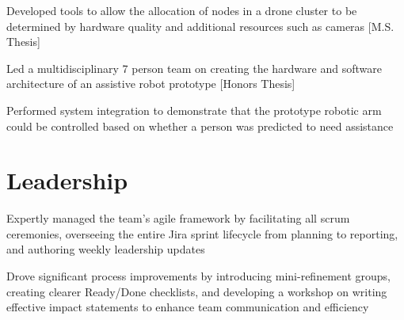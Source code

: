 \documentclass[]{deedy-resume-reversed}
\begin{document}
\begin{minipage}[t]{0.68\textwidth}
\descript{}
\begin{tightemize}
\item Developed tools to allow the allocation of nodes in a drone cluster to be determined by hardware quality and additional resources such as cameras [M.S. Thesis]
\item Led a multidisciplinary 7 person team on creating the hardware and software architecture of an assistive robot prototype [Honors Thesis]
\item Performed system integration to demonstrate that the prototype robotic arm could be controlled based on whether a person was predicted to need assistance 
\end{tightemize}
\sectionsep


\section{Leadership}

\begin{tightemize}
\item Expertly managed the team's agile framework by facilitating all scrum ceremonies, overseeing the entire Jira sprint lifecycle from planning to reporting, and authoring weekly leadership updates
\item Drove significant process improvements by introducing mini-refinement groups, creating clearer Ready/Done checklists, and developing a workshop on writing effective impact statements to enhance team communication and efficiency
\end{tightemize}


\end{minipage}
\end{document}
